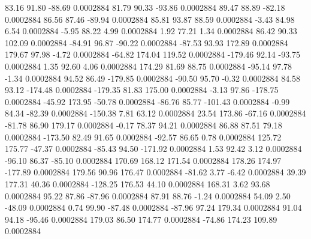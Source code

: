        83.16       91.80      -88.69     0.0002884
       81.79       90.33      -93.86     0.0002884
       89.47       88.89      -82.18     0.0002884
       86.56       87.46      -89.94     0.0002884
       85.81       93.87       88.59     0.0002884
       -3.43       84.98        6.54     0.0002884
       -5.95       88.22        4.99     0.0002884
        1.92       77.21        1.34     0.0002884
       86.42       90.33      102.09     0.0002884
      -84.91       96.87      -90.22     0.0002884
      -87.53       93.93      172.89     0.0002884
      179.67       97.98       -4.72     0.0002884
      -64.82      174.04      119.52     0.0002884
     -179.46       92.14      -93.75     0.0002884
        1.35       92.60        4.06     0.0002884
      174.29       81.69       88.75     0.0002884
      -95.14       97.78       -1.34     0.0002884
       94.52       86.49     -179.85     0.0002884
      -90.50       95.70       -0.32     0.0002884
       84.58       93.12     -174.48     0.0002884
     -179.35       81.83      175.00     0.0002884
       -3.13       97.86     -178.75     0.0002884
      -45.92      173.95      -50.78     0.0002884
      -86.76       85.77     -101.43     0.0002884
       -0.99       84.34      -82.39     0.0002884
     -150.38        7.81       63.12     0.0002884
       23.54      173.86      -67.16     0.0002884
      -81.78       86.90      179.17     0.0002884
       -0.17       78.37       94.21     0.0002884
       86.88       87.51       79.18     0.0002884
     -173.50       82.49       91.65     0.0002884
      -92.57       86.65        0.78     0.0002884
      125.72      175.77      -47.37     0.0002884
      -85.43       94.50     -171.92     0.0002884
        1.53       92.42        3.12     0.0002884
      -96.10       86.37      -85.10     0.0002884
      170.69      168.12      171.54     0.0002884
      178.26      174.97     -177.89     0.0002884
      179.56       90.96      176.47     0.0002884
      -81.62        3.77       -6.42     0.0002884
       39.39      177.31       40.36     0.0002884
     -128.25      176.53       44.10     0.0002884
      168.31        3.62       93.68     0.0002884
       95.22       87.86      -87.96     0.0002884
       87.91       88.76       -1.24     0.0002884
       54.09        2.50      -48.09     0.0002884
        0.74       99.90      -87.48     0.0002884
      -87.96       97.24      179.34     0.0002884
       91.04       94.18      -95.46     0.0002884
      179.03       86.50      174.77     0.0002884
      -74.86      174.23      109.89     0.0002884
